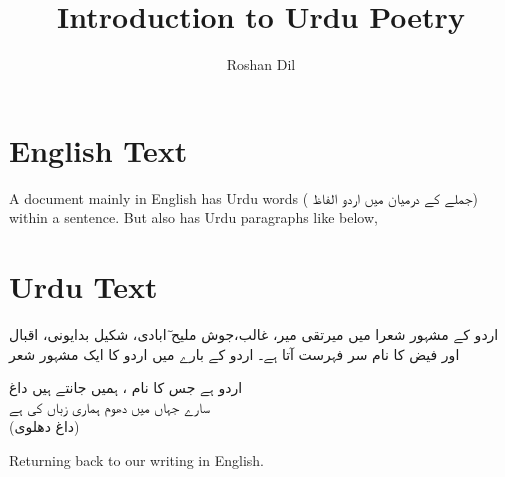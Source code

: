 \documentclass[12pt]{article}
\begin{document}
\title{\textenglish{Introduction to Urdu Poetry}}
\author{\textenglish{Roshan Dil}}
\maketitle
\tableofcontents


\section{\textenglish{English Text}}
\begin{otherlanguage}{english}
A document mainly in English has Urdu words 
(\texturdu{ جملے کے درمیان میں اردو الفاظ}) within a sentence.
But  also has Urdu paragraphs like below,
\end{otherlanguage}

\section{\textenglish{Urdu Text}}

اردو کے مشہور شعرا میں میرتقی میر، غالب،جوش ملیح ٓابادی، شکیل بدایونی،
 اقبال اور فیض کا نام سر فہرست آتا ہے۔  اردو کے بارے میں اردو کا  ایک مشہور شعر
\begin{center}
اردو ہے جس کا نام ، ہمیں جانتے ہیں داغ \\
سارے جہاں میں دھوم ہماری زباں کی ہے\\
\hspace{6cm} (داغ دھلوی)
\end{center}

\begin{english}
Returning  back to our writing in English.
\end{english}
\end{document}
